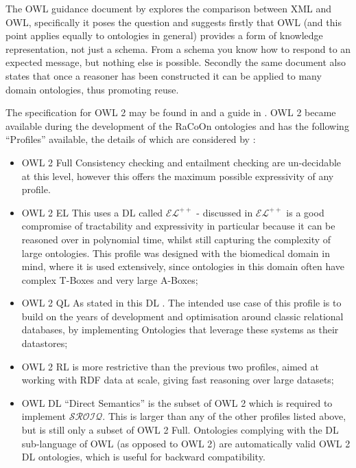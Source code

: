 The OWL guidance document by \citet{McGuinness04} explores the comparison between XML and OWL, specifically it poses the question  and suggests firstly that OWL (and this point applies equally to ontologies in general) provides a form of knowledge representation, not just a schema. From a schema you know how to respond to an expected message, but nothing else is possible. Secondly the same document also states that once a reasoner has been constructed it can be applied to many domain ontologies, thus promoting reuse.

The specification for OWL 2 may be found in \cite{Parsia:09:OWO} and a guide in \citet{Parsia12}. OWL 2 became available during the development of the RaCoOn ontologies and has the following ``Profiles'' available, the details of which are considered by \citet{Parsia12}:

\begin{itemize}
    \item OWL 2 Full Consistency checking and entailment checking are un-decidable at this level, however this offers the maximum possible expressivity of any profile. 
    \item OWL 2 EL This uses a DL called \(\mathcal{EL}^{++}\) - discussed in \citet{Baader2005} \(\mathcal{EL}^{++}\) is a good compromise of tractability and expressivity in particular because it can be reasoned over in polynomial time, whilst still capturing the complexity of large ontologies. This profile was designed with the biomedical domain in mind, where it is used extensively, since ontologies in this domain often have complex T-Boxes and very large A-Boxes;
    \item OWL 2 QL As stated in \citep{Parsia12} this DL . The intended use case of this profile is to build on the years of development and optimisation around classic relational databases, by implementing Ontologies that leverage these systems as their datastores;
    \item OWL 2 RL is more restrictive than the previous two profiles, aimed at working with RDF data at scale, giving fast reasoning over large datasets;
    \item OWL DL ``Direct Semantics'' is the subset of OWL 2 which is required to implement \(\mathcal{SROIQ}\). This is larger than any of the other profiles listed above, but is still only a subset of OWL 2 Full. Ontologies complying with the DL sub-language of OWL (as opposed to OWL 2) are automatically valid OWL 2 DL ontologies, which is useful for backward compatibility. 
\end{itemize}

